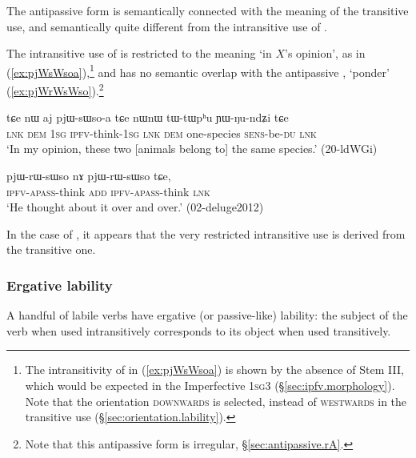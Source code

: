 The antipassive form  is semantically connected with the meaning of the transitive use, and semantically quite different from the intransitive use of  .

The intransitive use of  is restricted to the meaning `in $X$'s opinion', as in (\ref{ex:pjWsWsoa}),\footnote{The intransitivity of  in (\ref{ex:pjWsWsoa}) is shown by the absence of Stem III, which would be expected in the Imperfective \textsc{1sg}\fl{}3 (§\ref{sec:ipfv.morphology}). Note that the orientation \textsc{downwards} is selected, instead of \textsc{westwards} in the transitive use (§\ref{sec:orientation.lability}). } and has no semantic overlap with the antipassive , `ponder' (\ref{ex:pjWrWsWso}).\footnote{Note that this antipassive form is irregular, §\ref{sec:antipassive.rA}.}  

\begin{exe}
\ex \label{ex:pjWsWsoa}
\gll  tɕe nɯ aj pjɯ-sɯso-a tɕe nɯnɯ tɯ-tɯpʰu ɲɯ-ŋu-ndʑi tɕe \\
\textsc{lnk} \textsc{dem} \textsc{1sg} \textsc{ipfv}-think-\textsc{1sg} \textsc{lnk} \textsc{dem} one-species \textsc{sens}-be-\textsc{du} \textsc{lnk} \\
\glt  `In my opinion, these two [animals belong to] the same species.' (20-ldWGi)
\end{exe}

\begin{exe}
\ex \label{ex:pjWrWsWso}
\gll  pjɯ-rɯ-sɯso nɤ pjɯ-rɯ-sɯso tɕe, \\
\textsc{ipfv}-\textsc{apass}-think \textsc{add} \textsc{ipfv}-\textsc{apass}-think \textsc{lnk} \\
\glt `He thought about it over and over.' (02-deluge2012) 
\end{exe}

In the case of ,  it appears that the very restricted intransitive use is derived from the transitive one. 

\subsubsection{Ergative lability} \label{sec:lability.pass}
 
A handful of labile verbs have ergative (or passive-like) lability: the subject of the verb when used intransitively corresponds to its object when used transitively. 

